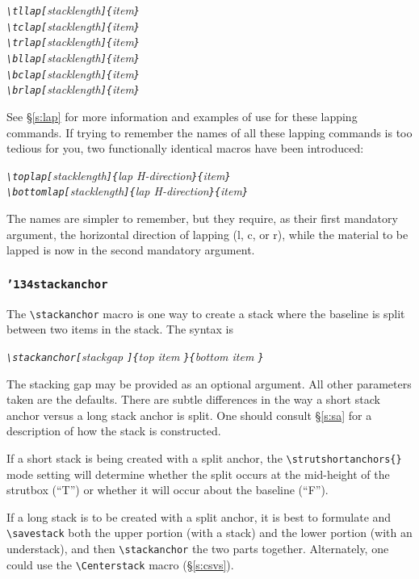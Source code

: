 \documentclass{article}
\let\vb\verb
\newcommand\cmd[1]{\texttt{\char'134#1}}
\begin{document}
\itshape
\vb|\tllap[|stacklength\vb|]{|item\vb|}|\\
\vb|\tclap[|stacklength\vb|]{|item\vb|}|\\
\vb|\trlap[|stacklength\vb|]{|item\vb|}|\\
\vb|\bllap[|stacklength\vb|]{|item\vb|}|\\
\vb|\bclap[|stacklength\vb|]{|item\vb|}|\\
\vb|\brlap[|stacklength\vb|]{|item\vb|}|
\upshape

See \S\ref{s:lap} for more information and examples of use for
these lapping commands.  If trying to remember the names of all these
lapping commands is too tedious for you, two functionally identical
macros have been introduced:

\itshape
\vb|\toplap[|stacklength\vb|]{|lap H-direction\vb|}{|item\vb|}|\\
\vb|\bottomlap[|stacklength\vb|]{|lap H-direction\vb|}{|item\vb|}|
\upshape

The names are simpler to remember, but they require, as their first
mandatory argument, the horizontal direction of lapping (l, c, or r),
while the material to be lapped is now in the second mandatory argument.
\vspace{-0.8ex}

\subsubsection{\cmd{stackanchor}\label{s:sanc}}

The \vb|\stackanchor| macro is one way to create a stack where the
baseline is split between two items in the stack.  The syntax is

\itshape
\vb|\stackanchor[|stackgap%
  \vb|]{|top item%
  \vb|}{|bottom item%
  \vb|}|
\upshape

The stacking gap may be provided as an optional argument.  All other
parameters taken are the defaults.  There are subtle differences in the
way a short stack anchor versus a long stack anchor is split.
One should consult \S\ref{s:sa} for a description of how the
stack is constructed.

If a short stack is being created with a split anchor, the
\vb|\strutshortanchors{}| mode setting will determine whether the split 
occurs at the mid-height of the strutbox (``T'') or whether it will 
occur about the baseline (``F'').

If a long stack is to be created with a split anchor, it is best to
formulate and \vb|\savestack| both the upper portion (with a stack)
and the lower portion (with an understack), and then \vb|\stackanchor|
the two parts together.  Alternately, one could use the 
\vb|\Centerstack| macro (\S\ref{s:csvs}).
\end{document}
